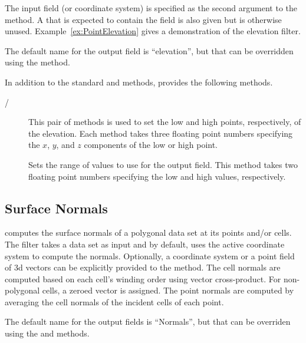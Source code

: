 The input field (or coordinate system) is specified as the second argument
to the  method. A  that is expected to
contain the field is also given but is otherwise unused.
Example~\ref{ex:PointElevation} gives a demonstration of the elevation
filter.

The default name for the output field is ``elevation'', but that can be
overridden using the  method.

In addition to the standard  and
 methods,  provides the
following methods.

\begin{description}
\item[/] This pair of methods
  is used to set the low and high points, respectively, of the elevation.
  Each method takes three floating point numbers specifying the $x$, $y$,
  and $z$ components of the low or high point.
\item[] Sets the range of values to use for the output
  field. This method takes two floating point numbers specifying the low
  and high values, respectively.
\end{description}


\subsection{Surface Normals}


 computes the surface normals of a polygonal data
set at its points and/or cells. The filter takes a data set as input and by
default, uses the active coordinate system to compute the normals. Optionally,
a coordinate system or a point field of 3d vectors can be explicitly provided
to the  method.
The cell normals are computed based on each cell's winding order using vector
cross-product. For non-polygonal cells, a zeroed vector is assigned.
The point normals are computed by averaging the cell normals of the
incident cells of each point.

The default name for the output fields is ``Normals'', but that can be
overriden using the  and
 methods.


